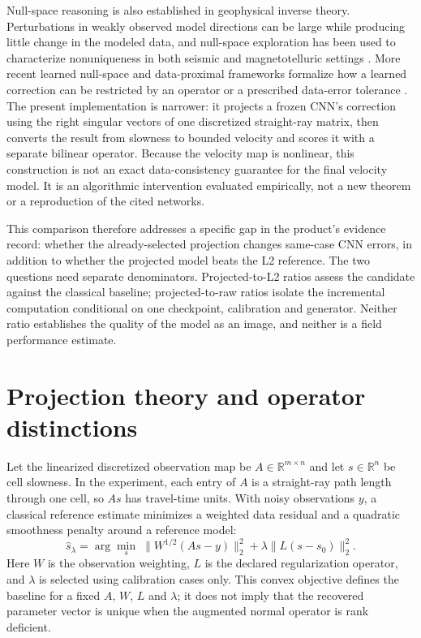 \documentclass[11pt]{article}
\newcounter{algorithm}
\begin{document}
Null-space reasoning is also established in geophysical inverse theory. Perturbations in weakly observed model directions can be large while producing little change in the modeled data, and null-space exploration has been used to characterize nonuniqueness in both seismic and magnetotelluric settings \cite{backus_gilbert_1968,pratt_1997,chave_2007}. More recent learned null-space and data-proximal frameworks formalize how a learned correction can be restricted by an operator or a prescribed data-error tolerance \cite{jacome_npn_2025,goeppel_2023}. The present implementation is narrower: it projects a frozen CNN's correction using the right singular vectors of one discretized straight-ray matrix, then converts the result from slowness to bounded velocity and scores it with a separate bilinear operator. Because the velocity map is nonlinear, this construction is not an exact data-consistency guarantee for the final velocity model. It is an algorithmic intervention evaluated empirically, not a new theorem or a reproduction of the cited networks.

This comparison therefore addresses a specific gap in the product's evidence record: whether the already-selected projection changes same-case CNN errors, in addition to whether the projected model beats the L2 reference. The two questions need separate denominators. Projected-to-L2 ratios assess the candidate against the classical baseline; projected-to-raw ratios isolate the incremental computation conditional on one checkpoint, calibration and generator. Neither ratio establishes the quality of the model as an image, and neither is a field performance estimate.

\section{Projection theory and operator distinctions}\label{sec:theory}
Let the linearized discretized observation map be $A\in\mathbb{R}^{m\times n}$ and let $s\in\mathbb{R}^n$ be cell slowness. In the experiment, each entry of $A$ is a straight-ray path length through one cell, so $As$ has travel-time units. With noisy observations $y$, a classical reference estimate minimizes a weighted data residual and a quadratic smoothness penalty around a reference model:
\begin{equation}\label{eq:l2-objective}
\hat{s}_{\lambda}=\arg\min_s\;\|W^{1/2}(As-y)\|_2^2+\lambda\|L(s-s_0)\|_2^2.
\end{equation}
Here $W$ is the observation weighting, $L$ is the declared regularization operator, and $\lambda$ is selected using calibration cases only. This convex objective defines the baseline for a fixed $A$, $W$, $L$ and $\lambda$; it does not imply that the recovered parameter vector is unique when the augmented normal operator is rank deficient.
\end{document}
